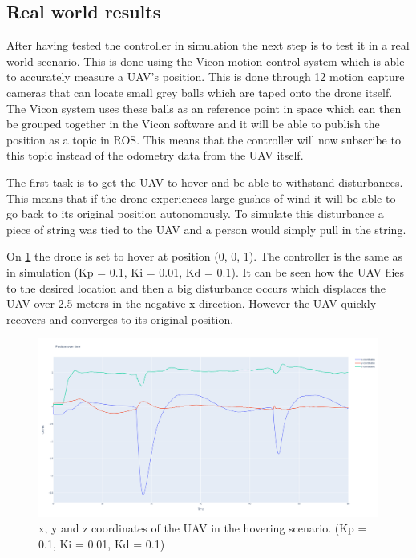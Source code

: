 \documentclass[conference]{IEEEtran}
\begin{document}
\subsection{Real world results}
After having tested the controller in simulation the next step is to test it in a real world scenario. This is done using the Vicon motion control system which is able to accurately measure a UAV's position. This is done through 12 motion capture cameras that can locate small grey balls which are taped onto the drone itself. The Vicon system uses these balls as an reference point in space which can then be grouped together in the Vicon software and it will be able to publish the position as a topic in ROS. This means that the controller will now subscribe to this topic instead of the odometry data from the UAV itself.

The first task is to get the UAV to hover and be able to withstand disturbances. This means that if the drone experiences large gushes of wind it will be able to go back to its original position autonomously. To simulate this disturbance a piece of string was tied to the UAV and a person would simply pull in the string.

On \cref{fig:task1_10_pos} the drone is set to hover at position (0, 0, 1). The controller is the same as in simulation (Kp = 0.1, Ki = 0.01, Kd = 0.1). It can be seen how the UAV flies to the desired location and then a big disturbance occurs which displaces the UAV over 2.5 meters in the negative x-direction. However the UAV quickly recovers and converges to its original position.  

\begin{figure}[hbtp]
	\centering
	\includegraphics[width=1.0\linewidth]{images/task1_10_pos.png}
	\caption{x, y and z coordinates of the UAV in the hovering scenario. (Kp = 0.1, Ki = 0.01, Kd = 0.1)}
	\label{fig:task1_10_pos}
\end{figure}
\end{document}
